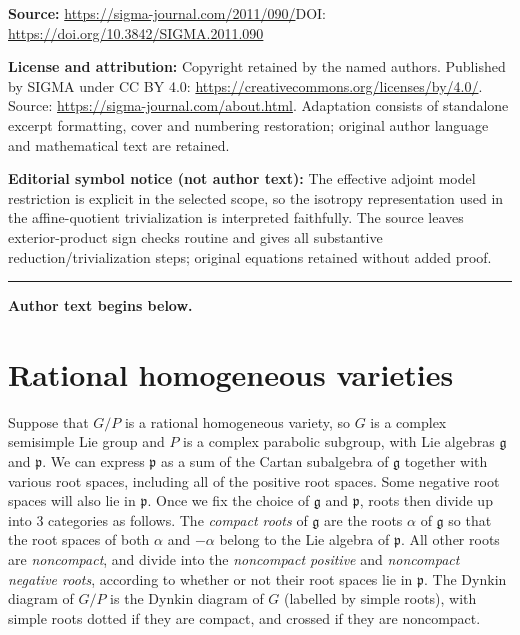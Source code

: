 \documentclass[11pt]{article}
\newcommand{\LieG}{\ensuremath{\mathfrak{g}}}
\newcommand{\LieP}{\ensuremath{\mathfrak{p}}}
\begin{document}
\noindent\textbf{Source:} \url{https://sigma-journal.com/2011/090/}\quad DOI: \url{https://doi.org/10.3842/SIGMA.2011.090}\par
\noindent\textbf{License and attribution:} Copyright retained by the named authors. Published by SIGMA under CC BY 4.0: \url{https://creativecommons.org/licenses/by/4.0/}. Source: \url{https://sigma-journal.com/about.html}. Adaptation consists of standalone excerpt formatting, cover and numbering restoration; original author language and mathematical text are retained.\par
\noindent\textbf{Editorial symbol notice (not author text):} The effective adjoint model restriction is explicit in the selected scope, so the isotropy representation used in the affine-quotient trivialization is interpreted faithfully. The source leaves exterior-product sign checks routine and gives all substantive reduction/trivialization steps; original equations retained without added proof.\par
\medskip\hrule\medskip\noindent\textbf{Author text begins below.}\par
\setcounter{section}{4}
\setcounter{subsection}{0}
\setcounter{subsubsection}{0}
\setcounter{equation}{0}
\setcounter{section}{3}
\setcounter{subsection}{0}
\setcounter{lemma}{1}
\setcounter{theorem}{1}
\setcounter{example}{1}
\section{Rational homogeneous varieties}

Suppose that $G/P$ is a rational homogeneous variety,
so $G$ is a complex semisimple Lie group
and $P$ is a complex parabolic subgroup,
with Lie algebras $\LieG$ and $\LieP$. We can
express $\LieP$ as a sum
of the Cartan subalgebra of $\LieG$ together with
various root spaces, including all of the positive
root spaces. Some negative root spaces will also lie
in $\LieP$. Once we f\/ix the choice
of $\LieG$ and $\LieP$, roots then divide up into
3 categories as follows. The \emph{compact roots} of $\LieG$ are
the roots $\alpha$ of $\LieG$ so that the root spaces of
both $\alpha$ and $-\alpha$ belong to the Lie algebra
of $\LieP$.
All other roots are \emph{noncompact}, and divide
into the \emph{noncompact positive} and \emph{noncompact negative
roots}, according to whether or not their root spaces
lie in $\LieP$.
The Dynkin diagram of $G/P$ is the Dynkin
diagram of $G$ (labelled by simple roots),
with simple roots dotted if they are compact,
and crossed if they are noncompact.
\end{document}
